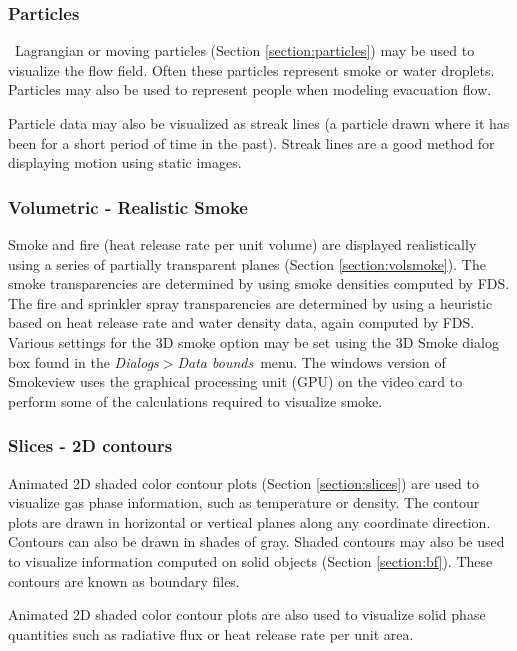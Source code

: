 \documentclass[11pt,twoside]{book}
\begin{document}
\subsubsection{Particles}\ Lagrangian or moving particles
(Section \ref{section:particles}) may be
used to visualize the flow field. Often these particles represent
smoke or water droplets.  Particles may also be used to represent
people when modeling evacuation flow.

Particle data may also be visualized as streak lines (a particle
drawn where it has been for a short period of time in the past).
Streak lines are a good method for displaying motion using static
images.

\subsubsection{Volumetric - Realistic Smoke}
Smoke and fire (heat release rate per unit volume) are displayed
realistically using a series of partially transparent planes
(Section \ref{section:volsmoke}). The smoke transparencies are
determined by using smoke densities computed by FDS.  The fire and
sprinkler spray transparencies are determined by using a heuristic
based on heat release rate and water density data, again computed
by FDS. Various settings for the 3D smoke option may be set using
the 3D Smoke dialog box found in the {\em Dialogs$>$Data bounds}\ menu.
The windows version of Smokeview uses the graphical processing
unit (GPU) on the video card to perform some of the calculations
required to visualize smoke.

\subsubsection{Slices - 2D contours}
Animated 2D shaded color contour plots (Section
\ref{section:slices}) are used to visualize gas phase information,
such as temperature or density. The contour plots are drawn in
horizontal or vertical planes along any coordinate direction.
Contours can also be drawn in shades of gray.
Shaded contours may also be used to visualize information
computed on solid objects (Section \ref{section:bf}).  These contours are known as boundary files.

Animated 2D shaded color contour plots are also used to
visualize solid phase quantities such as radiative flux or
heat release rate per unit area.
\end{document}
